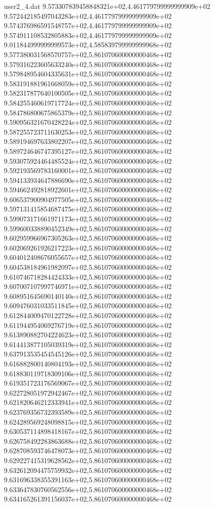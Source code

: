 \begin{filecontents}{user2_4.dat}
9.573307839458848321e+02,4.461779799999999909e+02
9.572442185497043283e+02,4.461779799999999909e+02
9.574376986591548757e+02,4.461779799999999909e+02
9.574911108532805883e+02,4.461779799999999909e+02
9.011844999999999573e+02,4.585839799999999968e+02
9.577380031568570757e+02,5.861070600000000468e+02
9.579316223605633240e+02,5.861070600000000468e+02
9.579848954604335631e+02,5.861070600000000468e+02
9.583191881961668059e+02,5.861070600000000468e+02
9.582317877640100505e+02,5.861070600000000468e+02
9.584255460619717724e+02,5.861070600000000468e+02
9.584786800675865379e+02,5.861070600000000468e+02
9.590956321670428224e+02,5.861070600000000468e+02
9.587255723711630253e+02,5.861070600000000468e+02
9.589194697633802207e+02,5.861070600000000468e+02
9.589724646747395127e+02,5.861070600000000468e+02
9.593075924464485524e+02,5.861070600000000468e+02
9.592193569783160001e+02,5.861070600000000468e+02
9.594133934647886690e+02,5.861070600000000468e+02
9.594662492818922601e+02,5.861070600000000468e+02
9.606537900904977505e+02,5.861070600000000468e+02
9.597131415854687475e+02,5.861070600000000468e+02
9.599073171661971173e+02,5.861070600000000468e+02
9.599600338890452349e+02,5.861070600000000468e+02
9.602959966967305263e+02,5.861070600000000468e+02
9.602069261926217223e+02,5.861070600000000468e+02
9.604012408676055657e+02,5.861070600000000468e+02
9.604538184961982097e+02,5.861070600000000468e+02
9.610746718284424333e+02,5.861070600000000468e+02
9.607007107997746971e+02,5.861070600000000468e+02
9.608951645690140140e+02,5.861070600000000468e+02
9.609476031033511845e+02,5.861070600000000468e+02
9.612844009470122728e+02,5.861070600000000468e+02
9.611944954069276719e+02,5.861070600000000468e+02
9.613890882704224623e+02,5.861070600000000468e+02
9.614413877105039319e+02,5.861070600000000468e+02
9.637913535454545126e+02,5.861070600000000468e+02
9.616882800140804193e+02,5.861070600000000468e+02
9.618830119718309106e+02,5.861070600000000468e+02
9.619351723176569067e+02,5.861070600000000468e+02
9.622728051972942467e+02,5.861070600000000468e+02
9.621820646212333941e+02,5.861070600000000468e+02
9.623769356732393589e+02,5.861070600000000468e+02
9.624289569248098815e+02,5.861070600000000468e+02
9.630537114898418167e+02,5.861070600000000468e+02
9.626758492283863688e+02,5.861070600000000468e+02
9.628708593746478073e+02,5.861070600000000468e+02
9.629227415319628562e+02,5.861070600000000468e+02
9.632612094475759932e+02,5.861070600000000468e+02
9.631696338355391163e+02,5.861070600000000468e+02
9.633647830760562556e+02,5.861070600000000468e+02
9.634165261391156037e+02,5.861070600000000468e+02

\end{filecontents}
